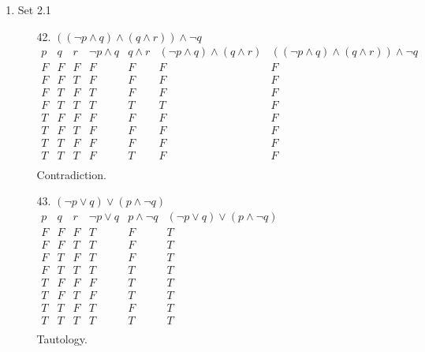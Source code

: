\documentclass[letterpaper]{article}
\begin{document}
\begin{enumerate}
\begin{enumerate}
			\item Set 2.1
			\begin{itemize}
				\item [42.]
				$\left( \left( \neg p \wedge q \right) \wedge \left( q \wedge r \right) \right) \wedge \neg q$ \\
				$\begin{array}{c|c|c|c|c|c|c}
					p & q & r & \neg p \wedge q & q \wedge r & \left( \neg p \wedge q \right) \wedge \left( q \wedge r \right) & \left( \left( \neg p \wedge q \right) \wedge \left( q \wedge r \right) \right) \wedge \neg q \\ \hline
					F & F & F & F & F & F & F \\ \hline
					F & F & T & F & F & F & F \\ \hline
					F & T & F & T & F & F & F \\ \hline
					F & T & T & T & T & T & F \\ \hline
					T & F & F & F & F & F & F \\ \hline
					T & F & T & F & F & F & F \\ \hline
					T & T & F & F & F & F & F \\ \hline
					T & T & T & F & T & F & F \\ 
				\end{array}$ \\
				Contradiction.
				
				\item [43.]
				$\left( \neg p \vee q \right) \vee \left( p \wedge \neg q \right)$ \\
				$\begin{array}{c|c|c|c|c|c}
					p & q & r & \neg p \vee q & p \wedge \neg q & \left( \neg p \vee q \right) \vee \left( p \wedge \neg q \right) \\ \hline
					F & F & F & T & F & T  \\ \hline
					F & F & T & T & F & T  \\ \hline
					F & T & F & T & F & T  \\ \hline
					F & T & T & T & T & T  \\ \hline
					T & F & F & F & T & T  \\ \hline
					T & F & T & F & T & T  \\ \hline
					T & T & F & T & F & T  \\ \hline
					T & T & T & T & T & T  \\ 
				\end{array}$ \\
				Tautology.
			\end{itemize}
			

\end{enumerate}
\end{enumerate}
\end{document}
